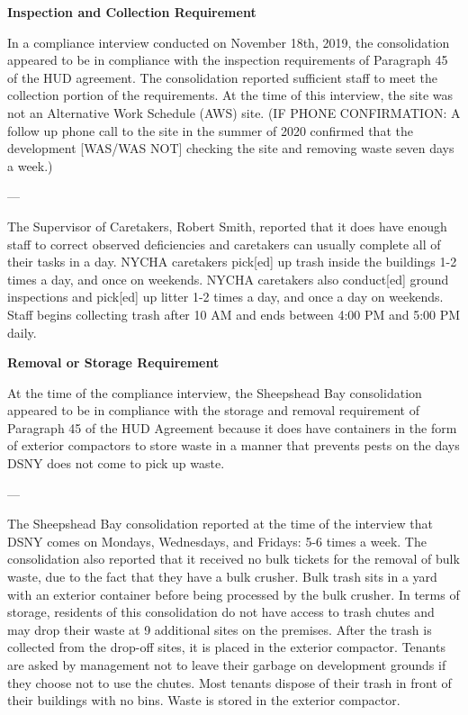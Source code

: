 

\textbf{Inspection and Collection Requirement}

In a compliance interview conducted on November 18th, 2019, the consolidation appeared to be in compliance with the inspection requirements of Paragraph 45 of the HUD agreement. The consolidation reported sufficient staff to meet the collection portion of the requirements. At the time of this interview, the site was not an Alternative Work Schedule (AWS) site. (IF PHONE CONFIRMATION: A follow up phone call to the site in the summer of 2020 confirmed that the development [WAS/WAS NOT] checking the site and removing waste seven days a week.)

---

The Supervisor of Caretakers, Robert Smith, reported that it does have enough staff to correct observed deficiencies and caretakers can usually complete all of their tasks in a day. NYCHA caretakers pick[ed] up trash inside the buildings 1-2 times a day, and once on weekends. NYCHA caretakers also conduct[ed] ground inspections and pick[ed] up litter 1-2 times a day, and once a day on weekends. Staff begins collecting trash after 10 AM and ends between 4:00 PM and 5:00 PM daily. 

\textbf{Removal or Storage Requirement}

At the time of the compliance interview, the Sheepshead Bay consolidation appeared to be in compliance with the storage and removal requirement of Paragraph 45 of the HUD Agreement because it does have containers in the form of exterior compactors to store waste in a manner that prevents pests on the days DSNY does not come to pick up waste.

---

The Sheepshead Bay consolidation reported at the time of the interview that DSNY comes on Mondays, Wednesdays, and Fridays: 5-6 times a week. The consolidation also reported that it received no bulk tickets for the removal of bulk waste, due to the fact that they have a bulk crusher. Bulk trash sits in a yard with an exterior container before being processed by the bulk crusher. In terms of storage, residents of this consolidation do not have access to trash chutes and may drop their waste at 9 additional sites on the premises. After the trash is collected from the drop-off sites, it is placed in the exterior compactor. Tenants are asked by management not to leave their garbage on development grounds if they choose not to use the chutes. Most tenants dispose of their trash in front of their buildings with no bins. Waste is stored in the exterior compactor. 

